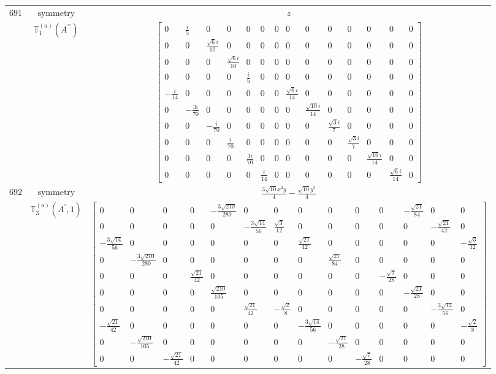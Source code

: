 \documentclass[fleqn,8pt,landscape]{jsarticle}
\begin{document}
\begin{longtable}{ccc}
$ 691 $ & $ \text{symmetry} $ & $ z $ \\
$  $ & $ \mathbb{T}_{1}^{(a)}(A^{\prime\prime}) $ & $ \begin{bmatrix} 0 & \frac{i}{5} & 0 & 0 & 0 & 0 & 0 & 0 & 0 & 0 & 0 & 0 & 0 & 0 \\ 0 & 0 & \frac{\sqrt{6} i}{10} & 0 & 0 & 0 & 0 & 0 & 0 & 0 & 0 & 0 & 0 & 0 \\ 0 & 0 & 0 & \frac{\sqrt{6} i}{10} & 0 & 0 & 0 & 0 & 0 & 0 & 0 & 0 & 0 & 0 \\ 0 & 0 & 0 & 0 & \frac{i}{5} & 0 & 0 & 0 & 0 & 0 & 0 & 0 & 0 & 0 \\ - \frac{i}{14} & 0 & 0 & 0 & 0 & 0 & 0 & \frac{\sqrt{6} i}{14} & 0 & 0 & 0 & 0 & 0 & 0 \\ 0 & - \frac{3 i}{70} & 0 & 0 & 0 & 0 & 0 & 0 & \frac{\sqrt{10} i}{14} & 0 & 0 & 0 & 0 & 0 \\ 0 & 0 & - \frac{i}{70} & 0 & 0 & 0 & 0 & 0 & 0 & \frac{\sqrt{3} i}{7} & 0 & 0 & 0 & 0 \\ 0 & 0 & 0 & \frac{i}{70} & 0 & 0 & 0 & 0 & 0 & 0 & \frac{\sqrt{3} i}{7} & 0 & 0 & 0 \\ 0 & 0 & 0 & 0 & \frac{3 i}{70} & 0 & 0 & 0 & 0 & 0 & 0 & \frac{\sqrt{10} i}{14} & 0 & 0 \\ 0 & 0 & 0 & 0 & 0 & \frac{i}{14} & 0 & 0 & 0 & 0 & 0 & 0 & \frac{\sqrt{6} i}{14} & 0 \end{bmatrix} $ \\ \hline
$ 692 $ & $ \text{symmetry} $ & $ \frac{3 \sqrt{10} x^{2} y}{4} - \frac{\sqrt{10} y^{3}}{4} $ \\
$  $ & $ \mathbb{T}_{3}^{(a)}(A^{\prime},1) $ & $ \begin{bmatrix} 0 & 0 & 0 & 0 & - \frac{3 \sqrt{210}}{280} & 0 & 0 & 0 & 0 & 0 & 0 & - \frac{\sqrt{21}}{84} & 0 & 0 \\ 0 & 0 & 0 & 0 & 0 & - \frac{3 \sqrt{14}}{56} & \frac{\sqrt{3}}{12} & 0 & 0 & 0 & 0 & 0 & - \frac{\sqrt{21}}{42} & 0 \\ - \frac{3 \sqrt{14}}{56} & 0 & 0 & 0 & 0 & 0 & 0 & \frac{\sqrt{21}}{42} & 0 & 0 & 0 & 0 & 0 & - \frac{\sqrt{3}}{12} \\ 0 & - \frac{3 \sqrt{210}}{280} & 0 & 0 & 0 & 0 & 0 & 0 & \frac{\sqrt{21}}{84} & 0 & 0 & 0 & 0 & 0 \\ 0 & 0 & 0 & \frac{\sqrt{21}}{42} & 0 & 0 & 0 & 0 & 0 & 0 & - \frac{\sqrt{7}}{28} & 0 & 0 & 0 \\ 0 & 0 & 0 & 0 & \frac{\sqrt{210}}{105} & 0 & 0 & 0 & 0 & 0 & 0 & - \frac{\sqrt{21}}{28} & 0 & 0 \\ 0 & 0 & 0 & 0 & 0 & \frac{\sqrt{21}}{42} & - \frac{\sqrt{2}}{8} & 0 & 0 & 0 & 0 & 0 & - \frac{3 \sqrt{14}}{56} & 0 \\ - \frac{\sqrt{21}}{42} & 0 & 0 & 0 & 0 & 0 & 0 & - \frac{3 \sqrt{14}}{56} & 0 & 0 & 0 & 0 & 0 & - \frac{\sqrt{2}}{8} \\ 0 & - \frac{\sqrt{210}}{105} & 0 & 0 & 0 & 0 & 0 & 0 & - \frac{\sqrt{21}}{28} & 0 & 0 & 0 & 0 & 0 \\ 0 & 0 & - \frac{\sqrt{21}}{42} & 0 & 0 & 0 & 0 & 0 & 0 & - \frac{\sqrt{7}}{28} & 0 & 0 & 0 & 0 \end{bmatrix} $ \\ \hline

\end{longtable}
\end{document}
